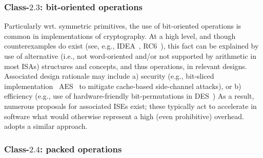 

\subsubsection{Class-$2.3$: bit-oriented operations}
\label{sec:bg:feature:2:3}

Particularly wrt. symmetric primitives, the use of bit-oriented operations 
is common in implementations of cryptography.  At a high level, and though 
counterexamples do exist 
(see, e.g., IDEA~\cite{SCARV:LaiMas:90}, RC6~\cite{SCARV:RRSY:98}),
this fact can be explained by use of alternative (i.e., not word-oriented
and/or not supported by arithmetic in most ISAs) structures and concepts,
and thus operations, in relevant designs.  Associated design rationale may
include
a) security
   (e.g., bit-sliced implementation~\cite{SCARV:KasSch:09} AES~\cite{SCARV:FIPS:197} to mitigate cache-based side-channel attacks),
   or
b) efficiency
   (e.g., use of hardware-friendly bit-permutations in DES~\cite{SCARV:FIPS:46_3})
As a result, numerous proposals for associated ISEs exist; these typically
act to accelerate in software what would otherwise represent a high (even 
prohibitive) overhead.  \XCID adopts a similar approach.


\subsubsection{Class-$2.4$: packed operations}
\label{sec:bg:feature:2:4}


